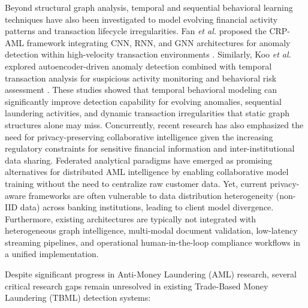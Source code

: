 \documentclass[conference]{IEEEtran}
\begin{document}
Beyond structural graph analysis, temporal and sequential behavioral learning techniques have also been investigated to model evolving financial activity patterns and transaction lifecycle irregularities. Fan \textit{et al.} proposed the CRP-AML framework integrating CNN, RNN, and GNN architectures for anomaly detection within high-velocity transaction environments \cite{fan2026}. Similarly, Koo \textit{et al.} explored autoencoder-driven anomaly detection combined with temporal transaction analysis for suspicious activity monitoring and behavioral risk assessment \cite{koo2024}. These studies showed that temporal behavioral modeling can significantly improve detection capability for evolving anomalies, sequential laundering activities, and dynamic transaction irregularities that static graph structures alone may miss. Concurrently, recent research has also emphasized the need for privacy-preserving collaborative intelligence given the increasing regulatory constraints for sensitive financial information and inter-institutional data sharing. Federated analytical paradigms have emerged as promising alternatives for distributed AML intelligence by enabling collaborative model training without the need to centralize raw customer data. Yet, current privacy-aware frameworks are often vulnerable to data distribution heterogeneity (non-IID data) across banking institutions, leading to client model divergence. Furthermore, existing architectures are typically not integrated with heterogeneous graph intelligence, multi-modal document validation, low-latency streaming pipelines, and operational human-in-the-loop compliance workflows in a unified implementation.

Despite significant progress in Anti-Money Laundering (AML) research, several critical research gaps remain unresolved in existing Trade-Based Money Laundering (TBML) detection systems:
\end{document}
